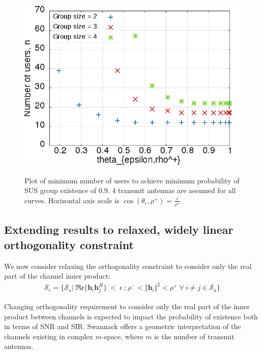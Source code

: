 \begin{figure}
    \includegraphics[width=12cm]{figs/existence.png}\\
    \caption{Plot of minimum number of users to achieve minimum probability of SUS group existence of 0.9. 4 transmit antennas are assumed for all curves. Horizontal axis scale is $\cos{(\theta_\epsilon,\rho^+)} = \frac{\epsilon}{\rho^+}$}
    \label{fig:reproduce_fig5a}
\end{figure}

\subsection{Extending results to relaxed, widely linear orthogonality constraint}

We now consider relaxing the orthogonality constraint to consider only the real part of the channel inner product:
\begin{equation}\label{eq:wl_S_e}
    \begin{aligned}
        \mathcal{S}_\epsilon = \lbrace \mathcal{S}_a \big|\ \mathfrak{Re} \lbrace \textbf{h}_i\textbf{h}_j^H \rbrace\ <\ \epsilon \ \text{;} \ \rho^-<\Vert \textbf{h}_i \Vert^2 < \rho^+\ \forall \ i \neq j \in \mathcal{S}_a \rbrace
    \end{aligned}
\end{equation}

Changing orthogonality requirement to consider only the real part of the inner product between channels is expected to impact the probability of existence both in terms of SNR and SIR. Swannack offers a geometric interpretation of the channels existing in complex $m$-space, where $m$ is the number of transmit antennas.

